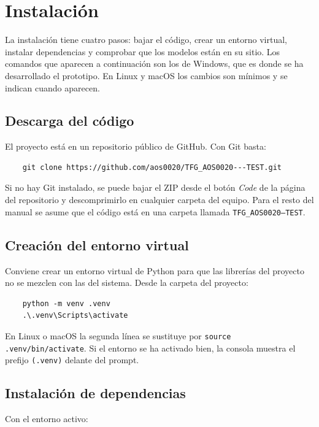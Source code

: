\section{Instalación}

La instalación tiene cuatro pasos: bajar el código, crear un entorno virtual, instalar dependencias y comprobar que los modelos están en su sitio. Los comandos que aparecen a continuación son los de Windows, que es donde se ha desarrollado el prototipo. En Linux y macOS los cambios son mínimos y se indican cuando aparecen.

\subsection*{Descarga del código}

El proyecto está en un repositorio público de GitHub. Con Git basta:

\begin{verbatim}
	git clone https://github.com/aos0020/TFG_AOS0020---TEST.git
\end{verbatim}

Si no hay Git instalado, se puede bajar el ZIP desde el botón \textit{Code} de la página del repositorio y descomprimirlo en cualquier carpeta del equipo. Para el resto del manual se asume que el código está en una carpeta llamada \texttt{TFG\_AOS0020---TEST}.

\subsection*{Creación del entorno virtual}

Conviene crear un entorno virtual de Python para que las librerías del proyecto no se mezclen con las del sistema. Desde la carpeta del proyecto:

\begin{verbatim}
	python -m venv .venv
	.\.venv\Scripts\activate
\end{verbatim}

En Linux o macOS la segunda línea se sustituye por \texttt{source .venv/bin/activate}. Si el entorno se ha activado bien, la consola muestra el prefijo \texttt{(.venv)} delante del prompt.

\subsection*{Instalación de dependencias}

Con el entorno activo:

